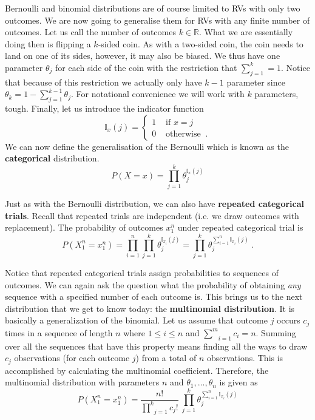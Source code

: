 Bernoulli and binomial distributions are of course limited to RVs with only two outcomes. We are now going to generalise them for 
RVs with any finite number of outcomes. Let us call the number of outcomes $ k \in \mathbb{R} $. What we are essentially doing then
is flipping a $ k $-sided coin. As with a two-sided coin, the coin needs to land on one of its sides, however, it may also be biased.
We thus have one parameter $ \theta_{j} $ for each side of the coin with the restriction that $ \sum_{j=1}^{k} = 1 $. Notice that
because of this restriction we actually only have $ k-1 $ parameter since $ \theta_{k} = 1 - \sum_{j=1}^{k-1}\theta_{j} $. For notational
convenience we will work with $ k $ parameters, tough. Finally, let us introduce the indicator function
\begin{equation}
\mathbb{I}_{x}(j) = \begin{cases}
1 & \mbox{ if } x = j \\
0 & \mbox{ otherwise } \ . 
\end{cases}
\end{equation}
We can now define the generalisation of the Bernoulli which is known as the \textbf{categorical} distribution.
\begin{equation}
P(X=x) = \prod_{j=1}^{k}\theta_{j}^{\mathbb{I}_{x}(j)}
\end{equation}

Just as with the Bernoulli distribution, we can also have \textbf{repeated categorical trials}. Recall that repeated trials
are independent (i.e. we draw outcomes with replacement). The probability of outcomes
$ x_{1}^{n} $ under repeated categorical trial is
\begin{equation}
P(X_{1}^{n} = x_{1}^{n}) = \prod_{i=1}^{n} \prod_{j=1}^{k}\theta_{j}^{\mathbb{I}_{x_{i}}(j)} = \prod_{j=1}^{k}\theta_{j}^{\sum_{i=1}^{n}\mathbb{I}_{x_{i}}(j)} \ .
\end{equation} 

Notice that repeated categorical trials assign probabilities to sequences of outcomes. We can again ask the question what the
probability of obtaining \textit{any} sequence with a specified number of each outcome is. This brings us to the next distribution that we get to know today: the \textbf{multinomial distribution}. It is basically a generalization
of the binomial. Let us assume that outcome $ j $ occurs $ c_{j} $ times in a sequence of length $ n $ where
$ 1 \leq i \leq n $ and $ \underset{i=1}{\overset{m}{\sum}}c_{i} = n $. Summing over all the sequences that have this property means finding all the ways
to draw $ c_{j} $ observations (for each outcome $ j $) from a total of $ n $ observations. This is accomplished by calculating the multinomial coefficient. 
Therefore, the multinomial distribution with parameters $ n $ and 
$ \theta_{1}, \ldots, \theta_{n} $ is given as 
\begin{equation}
P(X_{1}^{n} = x_{1}^{n}) = \dfrac{n!}{\underset{j=1}{\overset{k}{\prod}}c_{j}!}~\underset{j=1}{\overset{k}{\prod}} \theta_{j}^{\sum_{i=1}^{n}\mathbb{I}_{x_{i}}(j)}
\end{equation}


